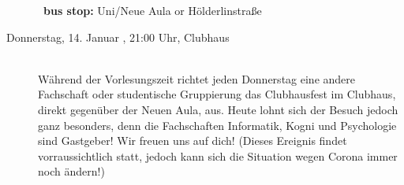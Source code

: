 \begin{description}
        ~\textbf{bus stop:} Uni/Neue Aula or Hölderlinstraße
\else
    \item[Donnerstag, 14. Januar \YEAR, 21:00 Uhr, Clubhaus]\ \\
        Während der Vorlesungszeit richtet jeden Donnerstag eine andere Fachschaft oder studentische Gruppierung das Clubhausfest im Clubhaus, direkt gegenüber der Neuen Aula, aus. Heute lohnt sich der Besuch jedoch ganz besonders, denn die Fachschaften Informatik, Kogni und Psychologie sind Gastgeber! Wir freuen uns auf dich! (Dieses Ereignis findet vorraussichtlich statt, jedoch kann sich die Situation wegen Corona immer noch ändern!)

\fi




\end{description}
